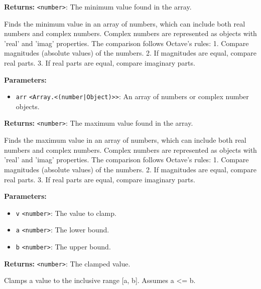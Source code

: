 \documentclass[12pt,a4paper]{article}
\begin{document}
\noindent \textbf{Returns:} \texttt{<number>}: The minimum value found in the array.

\noindent Finds the minimum value in an array of numbers, which can include both real numbers and complex numbers.
Complex numbers are represented as objects with 'real' and 'imag' properties.
The comparison follows Octave's rules:
1. Compare magnitudes (absolute values) of the numbers.
2. If magnitudes are equal, compare real parts.
3. If real parts are equal, compare imaginary parts.

\vspace{5mm}
\noindent {}


\noindent \textbf{Parameters:}
\begin{itemize}
  \item \texttt{arr} \texttt{<Array.<(number|Object)>>}: An array of numbers or complex number objects.
\end{itemize}

\noindent \textbf{Returns:} \texttt{<number>}: The maximum value found in the array.

\noindent Finds the maximum value in an array of numbers, which can include both real numbers and complex numbers.
Complex numbers are represented as objects with 'real' and 'imag' properties.
The comparison follows Octave's rules:
1. Compare magnitudes (absolute values) of the numbers.
2. If magnitudes are equal, compare real parts.
3. If real parts are equal, compare imaginary parts.

\vspace{5mm}
\noindent {}


\noindent \textbf{Parameters:}
\begin{itemize}
  \item \texttt{v} \texttt{<number>}: The value to clamp.
  \item \texttt{a} \texttt{<number>}: The lower bound.
  \item \texttt{b} \texttt{<number>}: The upper bound.
\end{itemize}

\noindent \textbf{Returns:} \texttt{<number>}: The clamped value.

\noindent Clamps a value to the inclusive range [a, b].
Assumes a <= b.
\end{document}
